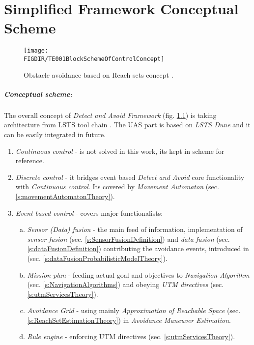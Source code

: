 \cleardoublepage

\chapter{Simplified Framework Conceptual Scheme}
\begin{figure}[H]
    \centering
    \texttt{[image: \\FIGDIR/TE001BlockSchemeOfControlConcept]} 
    \caption{Obstacle avoidance based on Reach sets concept \cite{gomola2017obstacle}.}
    \label{fig:avoidanceConcept}
\end{figure}

\paragraph{Conceptual scheme:} The overall concept of \emph{Detect and Avoid Framework} (fig. \ref{fig:avoidanceConcept}) is taking architecture from LSTS tool chain \cite{pinto2013lsts,pinto2012implementation}. The UAS part is based on \emph{LSTS Dune} and it can be easily integrated in future. 

\begin{enumerate}
    \item \emph{Continuous control} - is not solved in this work, its kept in scheme for reference. 
    
    \item \emph{Discrete control} - it bridges event based \emph{Detect and Avoid} core functionality with \emph{Continuous control}. Its covered by \emph{Movement Automaton} (sec. \ref{s:movementAutomatonTheory}).

   
    \item \emph{Event based control} - covers major functionalists:    
    \begin{enumerate}[a.]
        \item \emph{Sensor (Data) fusion} - the main feed of information, implementation of \emph{sensor fusion} (sec. \ref{s:SensorFusionDefinition}) and \emph{data fusion} (sec. \ref{s:dataFusionDefinition}) contributing the avoidance events, introduced in (sec. \ref{s:dataFusionProbabilisticModelTheory}).
        
        \item \emph{Mission plan} - feeding actual goal and objectives to \emph{Navigation Algorithm} (sec. \ref{s:NavigationAlgorithms}) and obeying \emph{UTM directives} (sec. \ref{s:utmServicesTheory}).
        
        \item \emph{Avoidance Grid}  - using mainly \emph{Approximation of Reachable Space} (sec. \ref{s:ReachSetEstimationTheory}) in \emph{Avoidance Maneuver Estimation}.
        
        \item \emph{Rule engine} - enforcing UTM directives (sec. \ref{s:utmServicesTheory}).
    \end{enumerate}
    
\end{enumerate}

